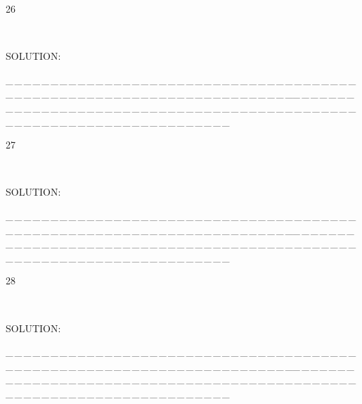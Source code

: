 \documentclass[a4paper, 11pt, UTF8]{article}
\begin{document}
\begin{large}
{\timesbf\Large 26} {\timessl\Large 
}\par\quad\,
{\timessl\Large
}\par
{\timesbf S\footnotesize{OLUTION:}}\par\quad

\par
{\tiny \_\,\_\,\_\,\_\,\_\,\_\,\_\,\_\,\_\,\_\,\_\,\_\,\_\,\_\,\_\,\_\,\_\,\_\,\_\,\_\,\_\,\_\,\_\,\_\,\_\,\_\,\_\,\_\,\_\,\_\,\_\,\_\,\_\,\_\,\_\,\_\,\_\,\_\,\_\,\_\,\_\,\_\,\_\,\_\,\_\,\_\,\_\,\_\,\_\,\_\,\_\,\_\,\_\,\_\,\_\,\_\,\_\,\_\,\_\,\_\,\_\,\_\,\_\,\_\,\_\,\_\,\_\,\_\,\_\,\_\,\_\_\,\_\,\_\,\_\,\_\,\_\,\_\,\_\,\_\,\_\,\_\,\_\,\_\,\_\,\_\,\_\,\_\,\_\,\_\,\_\,\_\,\_\,\_\,\_\,\_\,\_\,\_\,\_\,\_\,\_\,\_\,\_\,\_\,\_\,\_\,\_\,\_\,\_\,\_\,\_\,\_\,\_\,\_\,\_\,\_\,\_\,\_\,\_\,\_\,\_\,\_\,\_\,\_\,\_\,\_\,\_\,\_\,\_\,\_\,\_\,\_\,\_\,\_\,\_\,\_\,\_\,\_\,\_\,\_\,\_\,\_}\par

{\timesbf\Large 27} {\timessl\Large 
}\par\quad\,
{\timessl\Large
}\par
{\timesbf S\footnotesize{OLUTION:}}\par\quad

\par
{\tiny \_\,\_\,\_\,\_\,\_\,\_\,\_\,\_\,\_\,\_\,\_\,\_\,\_\,\_\,\_\,\_\,\_\,\_\,\_\,\_\,\_\,\_\,\_\,\_\,\_\,\_\,\_\,\_\,\_\,\_\,\_\,\_\,\_\,\_\,\_\,\_\,\_\,\_\,\_\,\_\,\_\,\_\,\_\,\_\,\_\,\_\,\_\,\_\,\_\,\_\,\_\,\_\,\_\,\_\,\_\,\_\,\_\,\_\,\_\,\_\,\_\,\_\,\_\,\_\,\_\,\_\,\_\,\_\,\_\,\_\,\_\_\,\_\,\_\,\_\,\_\,\_\,\_\,\_\,\_\,\_\,\_\,\_\,\_\,\_\,\_\,\_\,\_\,\_\,\_\,\_\,\_\,\_\,\_\,\_\,\_\,\_\,\_\,\_\,\_\,\_\,\_\,\_\,\_\,\_\,\_\,\_\,\_\,\_\,\_\,\_\,\_\,\_\,\_\,\_\,\_\,\_\,\_\,\_\,\_\,\_\,\_\,\_\,\_\,\_\,\_\,\_\,\_\,\_\,\_\,\_\,\_\,\_\,\_\,\_\,\_\,\_\,\_\,\_\,\_\,\_\,\_}\par

{\timesbf\Large 28} {\timessl\Large 
}\par\quad\,
{\timessl\Large
}\par
{\timesbf S\footnotesize{OLUTION:}}\par\quad

\par
{\tiny \_\,\_\,\_\,\_\,\_\,\_\,\_\,\_\,\_\,\_\,\_\,\_\,\_\,\_\,\_\,\_\,\_\,\_\,\_\,\_\,\_\,\_\,\_\,\_\,\_\,\_\,\_\,\_\,\_\,\_\,\_\,\_\,\_\,\_\,\_\,\_\,\_\,\_\,\_\,\_\,\_\,\_\,\_\,\_\,\_\,\_\,\_\,\_\,\_\,\_\,\_\,\_\,\_\,\_\,\_\,\_\,\_\,\_\,\_\,\_\,\_\,\_\,\_\,\_\,\_\,\_\,\_\,\_\,\_\,\_\,\_\_\,\_\,\_\,\_\,\_\,\_\,\_\,\_\,\_\,\_\,\_\,\_\,\_\,\_\,\_\,\_\,\_\,\_\,\_\,\_\,\_\,\_\,\_\,\_\,\_\,\_\,\_\,\_\,\_\,\_\,\_\,\_\,\_\,\_\,\_\,\_\,\_\,\_\,\_\,\_\,\_\,\_\,\_\,\_\,\_\,\_\,\_\,\_\,\_\,\_\,\_\,\_\,\_\,\_\,\_\,\_\,\_\,\_\,\_\,\_\,\_\,\_\,\_\,\_\,\_\,\_\,\_\,\_\,\_\,\_\,\_}\par


\end{large}
\end{document}
